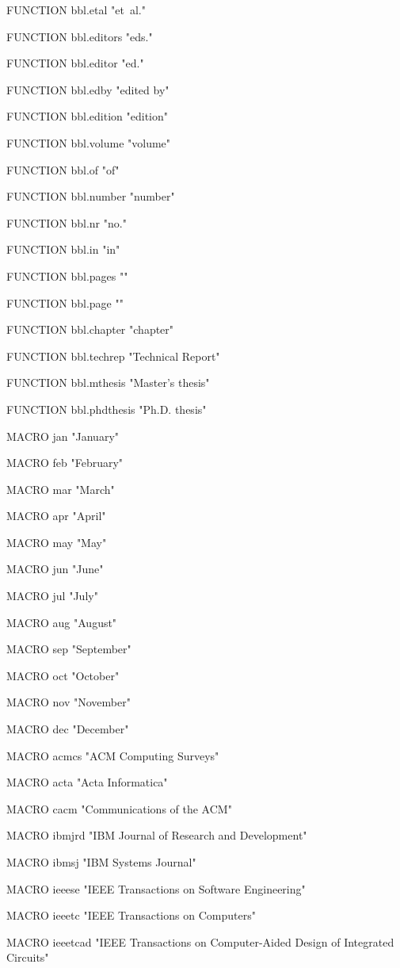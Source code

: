 FUNCTION {bbl.etal}
{ "et~al." }

FUNCTION {bbl.editors}
{ "eds." }

FUNCTION {bbl.editor}
{ "ed." }

FUNCTION {bbl.edby}
{ "edited by" }

FUNCTION {bbl.edition}
{ "edition" }

FUNCTION {bbl.volume}
{ "volume" }

FUNCTION {bbl.of}
{ "of" }

FUNCTION {bbl.number}
{ "number" }

FUNCTION {bbl.nr}
{ "no." }

FUNCTION {bbl.in}
{ "in" }

FUNCTION {bbl.pages}
{ "" }

FUNCTION {bbl.page}
{ "" }

FUNCTION {bbl.chapter}
{ "chapter" }

FUNCTION {bbl.techrep}
{ "Technical Report" }

FUNCTION {bbl.mthesis}
{ "Master's thesis" }

FUNCTION {bbl.phdthesis}
{ "Ph.D. thesis" }

MACRO {jan} {"January"}

MACRO {feb} {"February"}

MACRO {mar} {"March"}

MACRO {apr} {"April"}

MACRO {may} {"May"}

MACRO {jun} {"June"}

MACRO {jul} {"July"}

MACRO {aug} {"August"}

MACRO {sep} {"September"}

MACRO {oct} {"October"}

MACRO {nov} {"November"}

MACRO {dec} {"December"}

MACRO {acmcs} {"ACM Computing Surveys"}

MACRO {acta} {"Acta Informatica"}

MACRO {cacm} {"Communications of the ACM"}

MACRO {ibmjrd} {"IBM Journal of Research and Development"}

MACRO {ibmsj} {"IBM Systems Journal"}

MACRO {ieeese} {"IEEE Transactions on Software Engineering"}

MACRO {ieeetc} {"IEEE Transactions on Computers"}

MACRO {ieeetcad}
{"IEEE Transactions on Computer-Aided Design of Integrated Circuits"}


